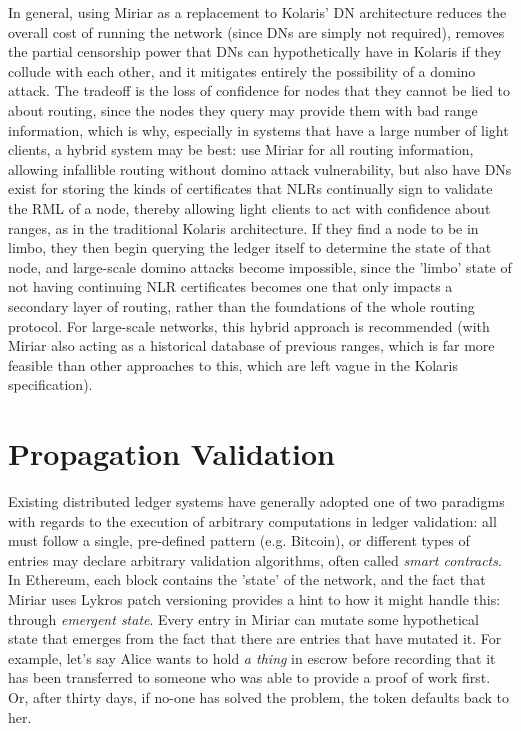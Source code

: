 \documentclass{extreport}
\begin{document}
In general, using Miriar as a replacement to Kolaris' DN architecture reduces the overall cost of running the network (since DNs are simply not required), removes the partial censorship power that DNs can hypothetically have in Kolaris if they collude with each other, and it mitigates entirely the possibility of a domino attack. The tradeoff is the loss of confidence for nodes that they cannot be lied to about routing, since the nodes they query may provide them with bad range information, which is why, especially in systems that have a large number of light clients, a hybrid system may be best: use Miriar for all routing information, allowing infallible routing without domino attack vulnerability, but also have DNs exist for storing the kinds of certificates that NLRs continually sign to validate the RML of a node, thereby allowing light clients to act with confidence about ranges, as in the traditional Kolaris architecture. If they find a node to be in limbo, they then begin querying the ledger itself to determine the state of that node, and large-scale domino attacks become impossible, since the 'limbo' state of not having continuing NLR certificates becomes one that only impacts a secondary layer of routing, rather than the foundations of the whole routing protocol. For large-scale networks, this hybrid approach is recommended (with Miriar also acting as a historical database of previous ranges, which is far more feasible than other approaches to this, which are left vague in the Kolaris specification).

\chapter{Propagation Validation}
\label{sec:org8c98352}

Existing distributed ledger systems have generally adopted one of two paradigms with regards to the execution of arbitrary computations in ledger validation: all must follow a single, pre-defined pattern (e.g. Bitcoin), or different types of entries may declare arbitrary validation algorithms, often called \emph{smart contracts}. In Ethereum, each block contains the 'state' of the network, and the fact that Miriar uses Lykros patch versioning provides a hint to how it might handle this: through \emph{emergent state}. Every entry in Miriar can mutate some hypothetical state that emerges from the fact that there are entries that have mutated it. For example, let's say Alice wants to hold \emph{a thing} in escrow before recording that it has been transferred to someone who was able to provide a proof of work first. Or, after thirty days, if no-one has solved the problem, the token defaults back to her.
\end{document}
